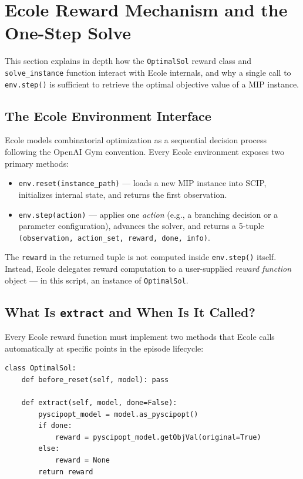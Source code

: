\section{Ecole Reward Mechanism and the One-Step Solve}

This section explains in depth how the \texttt{OptimalSol} reward class and \texttt{solve\_instance} function interact with Ecole internals, and why a single call to \texttt{env.step()} is sufficient to retrieve the optimal objective value of a MIP instance.

\subsection{The Ecole Environment Interface}

Ecole models combinatorial optimization as a sequential decision process following the OpenAI Gym convention. Every Ecole environment exposes two primary methods:

\begin{itemize}
    \item \texttt{env.reset(instance\_path)} --- loads a new MIP instance into SCIP, initializes internal state, and returns the first observation.
    \item \texttt{env.step(action)} --- applies one \emph{action} (e.g., a branching decision or a parameter configuration), advances the solver, and returns a 5-tuple \texttt{(observation, action\_set, reward, done, info)}.
\end{itemize}

The \texttt{reward} in the returned tuple is not computed inside \texttt{env.step()} itself. Instead, Ecole delegates reward computation to a user-supplied \emph{reward function} object --- in this script, an instance of \texttt{OptimalSol}.

\subsection{What Is \texttt{extract} and When Is It Called?}

Every Ecole reward function must implement two methods that Ecole calls automatically at specific points in the episode lifecycle:

\begin{lstlisting}
class OptimalSol:
    def before_reset(self, model): pass

    def extract(self, model, done=False):
        pyscipopt_model = model.as_pyscipopt()
        if done:
            reward = pyscipopt_model.getObjVal(original=True)
        else:
            reward = None
        return reward
\end{lstlisting}

